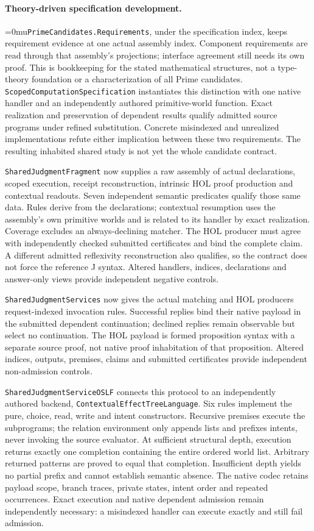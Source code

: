 \documentclass[11pt]{article}
\newcommand{\leanname}[1]{\textup{\Urlmuskip=0mu\relax\nolinkurl{#1}}}
\theoremstyle{definition}
\theoremstyle{remark}
\begin{document}
\paragraph{Theory-driven specification development.}
\leanname{PrimeCandidates.Requirements}, under the specification index,
keeps requirement evidence at one actual assembly index. Component requirements
are read through that assembly's projections; interface agreement still needs
its own proof. This is bookkeeping for the stated mathematical structures,
not a type-theory foundation or a characterization of all Prime candidates.
\texttt{ScopedComputationSpecification} instantiates this distinction with
one native handler and an independently authored primitive-world function.
Exact realization and preservation of dependent results qualify admitted
source programs under refined substitution. Concrete misindexed and
unrealized implementations refute either implication between these two
requirements. The resulting inhabited shared study is not yet the whole
candidate contract.

\texttt{SharedJudgmentFragment} now supplies a raw assembly of actual
declarations, scoped execution, receipt reconstruction, intrinsic HOL proof
production and contextual readouts. Seven independent semantic predicates
qualify those same data. Rules derive from the declarations; contextual
resumption uses the assembly's own primitive worlds and is related to its
handler by exact realization. Coverage excludes an always-declining matcher.
The HOL producer must agree with independently checked submitted certificates
and bind the complete claim. A different admitted reflexivity reconstruction
also qualifies, so the contract does not force the reference J syntax.
Altered handlers, indices, declarations and answer-only views provide
independent negative controls.

\texttt{SharedJudgmentServices} now gives the actual matching and HOL
producers request-indexed invocation rules. Successful replies bind their
native payload in the submitted dependent continuation; declined replies
remain observable but select no continuation. The HOL payload is formed
proposition syntax with a separate source proof, not native proof inhabitation
of that proposition. Altered indices, outputs, premises, claims and submitted
certificates provide independent non-admission controls.

\texttt{SharedJudgmentServiceOSLF} connects this protocol to an independently
authored backend, \texttt{ContextualEffectTreeLanguage}. Six rules implement the pure,
choice, read, write and intent constructors. Recursive premises execute the
subprograms; the relation environment only appends lists and prefixes intents,
never invoking the source evaluator. At sufficient structural depth, execution
returns exactly one completion containing the entire ordered world list.
Arbitrary returned patterns are proved to equal that completion. Insufficient
depth yields no partial prefix and cannot establish semantic absence.
The native codec retains payload scope, branch traces, private states,
intent order and repeated occurrences. Exact execution and native dependent
admission remain independently necessary: a misindexed handler can execute
exactly and still fail admission.
\end{document}

